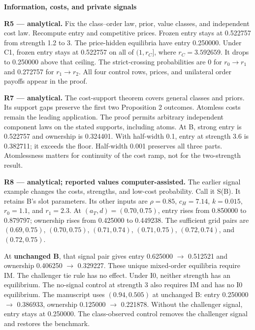 \documentclass[11pt]{article}
\begin{document}
{\large\bfseries Information, costs, and private signals}\par

\textbf{R5 --- analytical.} Fix the class--order law, prior, value classes, and independent cost law. Recompute entry and competitive prices.
Frozen entry stays at 0.522757 from strength 1.2 to 3. The price-hidden equilibria have entry 0.250000.
Under C1, frozen entry stays at 0.522757 on all of $(1,r_C]$, where $r_C=3.592659$. It drops to 0.250000 above that ceiling.
The strict-crossing probabilities are 0 for $r_0\to r_1$ and 0.272757 for $r_1\to r_2$.
All four control rows, prices, and unilateral order payoffs appear in the proof.

\textbf{R7 --- analytical.} The cost-support theorem covers general classes and priors. Its support gaps preserve the first two Proposition 2 outcomes.
Atomless costs remain the leading application. The proof permits arbitrary independent component laws on the stated supports, including atoms.
At B, strong entry is 0.522757 and ownership is 0.324401.
With half-width 0.1, entry at strength 3.6 is 0.382711; it exceeds the floor.
Half-width 0.001 preserves all three parts. Atomlessness matters for continuity of the cost ramp, not for the two-strength result.

\textbf{R8 --- analytical; reported values computer-assisted.} The earlier signal example changes the costs, strengths, and low-cost probability.
Call it S(B). It retains B's slot parameters. Its other inputs are $\rho=0.85$, $c_H=7.14$, $k=0.015$, $r_0=1.1$, and $r_1=2.3$.
At $(a_T,d)=(0.70,0.75)$, entry rises from 0.850000 to 0.879797; ownership rises from 0.425000 to 0.449238.
The sufficient grid pairs are $(0.69,0.75)$, $(0.70,0.75)$, $(0.71,0.74)$, $(0.71,0.75)$, $(0.72,0.74)$, and $(0.72,0.75)$.

At \textbf{unchanged B}, that signal pair gives entry 0.625000 $\to$ 0.512521 and ownership 0.406250 $\to$ 0.329227.
These unique mixed-order equilibria require IM. The challenger tie rule has no effect.
Under I0, neither strength has an equilibrium. The no-signal control at strength 3 also requires IM and has no I0 equilibrium.
The manuscript uses $(0.94,0.505)$ at unchanged B: entry 0.250000 $\to$ 0.386933, ownership 0.125000 $\to$ 0.221878.
Without the challenger signal, entry stays at 0.250000. The class-observed control removes the challenger signal and restores the benchmark.
\end{document}
